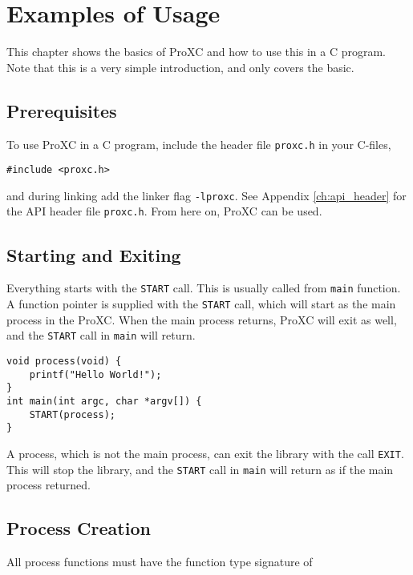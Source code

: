 
\chapter{Examples of Usage}
\label{ch:examples_usage}

This chapter shows the basics of ProXC and how to use this in a C program. Note that this is a very simple introduction, and only covers the basic.

\section*{Prerequisites}

To use ProXC in a C program, include the header file \texttt{proxc.h} in your C\hyp{}files, 

\begin{lstlisting}[style={CustomC},frame={},numbers={none}]
#include <proxc.h>
\end{lstlisting}

\noindent and during linking add the linker flag \texttt{-lproxc}. See Appendix \ref{ch:api_header} for the API header file \texttt{proxc.h}. From here on, ProXC can be used.

\section*{Starting and Exiting}

Everything starts with the \texttt{START} call. This is usually called from \texttt{main} function. A function pointer is supplied with the \texttt{START} call, which will start as the main process in the ProXC. When the main process returns, ProXC will exit as well, and the \texttt{START} call in \texttt{main} will return.

\begin{lstlisting}[style={CustomC},caption={Hello World in ProXC}]
void process(void) {
    printf("Hello World!");
}
int main(int argc, char *argv[]) {
    START(process);
}
\end{lstlisting}

A process, which is not the main process, can exit the library with the call \texttt{EXIT}. This will stop the library, and the \texttt{START} call in \texttt{main} will return as if the main process returned. 

\section*{Process Creation}
All process functions must have the function type signature of

